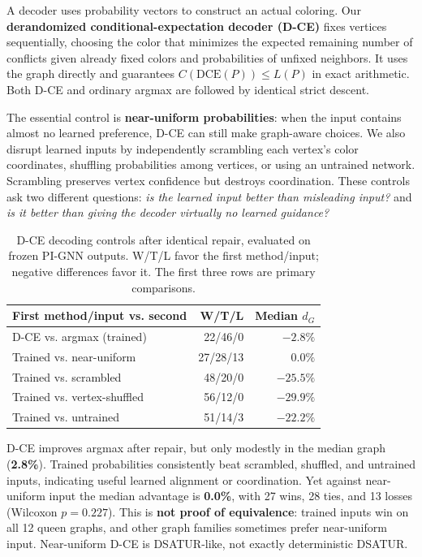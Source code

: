 \documentclass[11pt,letterpaper,twocolumn]{article}
\begin{document}
A decoder uses probability vectors to construct an actual coloring. Our \textbf{derandomized conditional-expectation decoder (D-CE)} fixes vertices sequentially, choosing the color that minimizes the expected remaining number of conflicts given already fixed colors and probabilities of unfixed neighbors. It uses the graph directly and guarantees \(C(\mathrm{DCE}(P))\leq L(P)\) in exact arithmetic. Both D-CE and ordinary argmax are followed by identical strict descent.

The essential control is \textbf{near-uniform probabilities}: when the input contains almost no learned preference, D-CE can still make graph-aware choices. We also disrupt learned inputs by independently scrambling each vertex's color coordinates, shuffling probabilities among vertices, or using an untrained network. Scrambling preserves vertex confidence but destroys coordination. These controls ask two different questions: \emph{is the learned input better than misleading input?} and \emph{is it better than giving the decoder virtually no learned guidance?}

\begin{table}[H]
\centering
\small
\setlength{\tabcolsep}{3pt}
\begin{tabular}{@{}lrr@{}}
\toprule
First method/input vs. second & W/T/L & Median $d_G$ \\
\midrule
D-CE vs. argmax (trained) & 22/46/0 & $-2.8\%$ \\
Trained vs. near-uniform & 27/28/13 & $0.0\%$ \\
Trained vs. scrambled & 48/20/0 & $-25.5\%$ \\
Trained vs. vertex-shuffled & 56/12/0 & $-29.9\%$ \\
Trained vs. untrained & 51/14/3 & $-22.2\%$ \\
\bottomrule
\end{tabular}
\caption{D-CE decoding controls after identical repair, evaluated on frozen PI-GNN outputs. W/T/L favor the first method/input; negative differences favor it. The first three rows are primary comparisons.}
\label{tab:decoding}
\end{table}
D-CE improves argmax after repair, but only modestly in the median graph (\textbf{2.8\%}). Trained probabilities consistently beat scrambled, shuffled, and untrained inputs, indicating useful learned alignment or coordination. Yet against near-uniform input the median advantage is \textbf{0.0\%}, with 27 wins, 28 ties, and 13 losses (Wilcoxon \(p=0.227\)). This is \textbf{not proof of equivalence}: trained inputs win on all 12 queen graphs, and other graph families sometimes prefer near-uniform input. Near-uniform D-CE is DSATUR-like, not exactly deterministic DSATUR.
\end{document}
